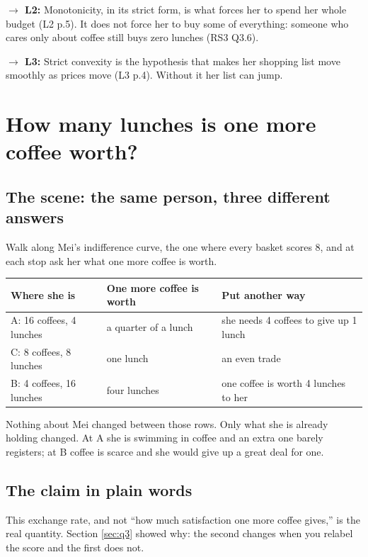 \documentclass[11pt,letterpaper]{article}
\theoremstyle{definition}
\theoremstyle{plain}
\newcommand{\src}[1]{{\small\textsf{(#1)}}}
\newcommand{\fwd}[1]{\textsf{\textbf{$\rightarrow$ #1:}}}
\begin{document}
\fwd{L2} Monotonicity, in its strict form, is what forces her to spend her whole budget
\src{L2 p.5}. It does not force her to buy some of everything: someone who cares only about coffee
still buys zero lunches \src{RS3 Q3.6}.

\fwd{L3} Strict convexity is the hypothesis that makes her shopping list move smoothly as prices
move \src{L3 p.4}. Without it her list can jump.
\section{How many lunches is one more coffee worth?}
\label{sec:q5}

\subsection{The scene: the same person, three different answers}

Walk along Mei's indifference curve, the one where every basket scores 8, and at each stop ask her
what one more coffee is worth.

\begin{center}
\begin{tabular}{@{}lll@{}}
\toprule
\textbf{Where she is} & \textbf{One more coffee is worth} & \textbf{Put another way} \\
\midrule
A: 16 coffees, 4 lunches & a quarter of a lunch & she needs 4 coffees to give up 1 lunch \\
C: 8 coffees, 8 lunches & one lunch & an even trade \\
B: 4 coffees, 16 lunches & four lunches & one coffee is worth 4 lunches to her \\
\bottomrule
\end{tabular}
\end{center}

Nothing about Mei changed between those rows. Only what she is already holding changed. At A she is
swimming in coffee and an extra one barely registers; at B coffee is scarce and she would give up a
great deal for one.

\subsection{The claim in plain words}

This exchange rate, and not ``how much satisfaction one more coffee gives,'' is the real quantity.
Section \ref{sec:q3} showed why: the second changes when you relabel the score and the first does
not.
\end{document}
